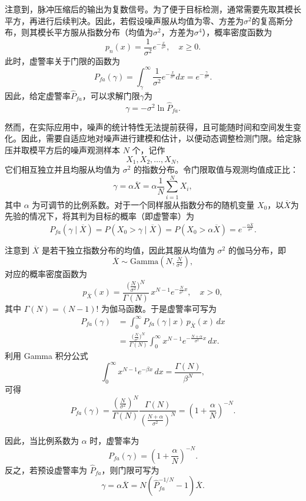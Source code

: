 注意到，脉冲压缩后的输出为复数信号。为了便于目标检测，通常需要先取其模长平方，再进行后续判决。因此，若假设噪声服从均值为零、方差为\( \sigma^2 \)的复高斯分布，则其模长平方服从指数分布（均值为\( \sigma^2 \)，方差为\( \sigma^4 \)），概率密度函数为
\[
    p_n(x) = \frac{1}{\sigma^2} e^{-\frac{x}{\sigma^2}}, \quad x \geq 0.
\]
此时，虚警率关于门限的函数为
\[
    P_{fa}(\gamma) = \int_{\gamma}^{\infty} \frac{1}{\sigma^2} e^{-\frac{x}{\sigma^2}} dx = e^{-\frac{\gamma}{\sigma^2}}.
\]
因此，给定虚警率\( \hat{P}_{fa} \)，可以求解门限\( \gamma \)为
\[
    \gamma = -\sigma^2 \ln \hat{P}_{fa}.
\]

然而，在实际应用中，噪声的统计特性无法提前获得，且可能随时间和空间发生变化。因此，需要自适应地对噪声进行建模和估计，以便动态调整检测门限。给定脉压并取模平方后的噪声观测样本 \( N \) 个，记作
\[
    X_1, X_2, \ldots, X_N,
\]
它们相互独立并且均服从均值为 \( \sigma^2 \) 的指数分布。令门限取值与观测均值成正比：
\[
    \gamma = \alpha \overline{X} = \alpha \frac{1}{N}\sum_{i=1}^{N} X_i,
\]
其中 \( \alpha \) 为可调节的比例系数。对于一个同样服从指数分布的随机变量 \( X_0 \)，以\( \overline{X} \)为先验的情况下，将其判为目标的概率（即虚警率）为
\[
    P_{fa}(\gamma \mid \overline{X}) = P(X_0 > \gamma \mid \overline{X})
    = P(X_0 > \alpha \overline{X})
    = e^{-\tfrac{\alpha \overline{X}}{\sigma^2}}.
\]

注意到 \( \overline{X} \) 是若干独立指数分布的均值，因此其服从均值为 \( \sigma^2 \) 的伽马分布，即
\[
    \overline{X} \sim \mathrm{Gamma}\!\left(N, \tfrac{N}{\sigma^2}\right),
\]
对应的概率密度函数为
\[
    p_{\overline{X}}(x) = \frac{\bigl(\tfrac{N}{\sigma^2}\bigr)^N}{\Gamma(N)}\,x^{N-1}
    e^{-\tfrac{N}{\sigma^2}x}, \quad x>0,
\]
其中 \( \Gamma(N)=(N-1)! \) 为伽马函数。于是虚警率可写为
\[
    \begin{aligned}
        P_{fa}(\gamma)
         & = \int_{0}^{\infty} P_{fa}(\gamma \mid x)\,p_{\overline{X}}(x)\,dx \\
         & = \frac{\bigl(\tfrac{N}{\sigma^2}\bigr)^N}{\Gamma(N)}
        \int_{0}^{\infty} x^{N-1} e^{-\tfrac{N+\alpha}{\sigma^2}x}\,dx.
    \end{aligned}
\]
利用 Gamma 积分公式
\[
    \int_{0}^{\infty} x^{N-1} e^{-\beta x}\,dx = \frac{\Gamma(N)}{\beta^N},
\]
可得
\[
    P_{fa}(\gamma) = \frac{\left(\frac{N}{\sigma^2}\right)^{N}}{\Gamma(N)} \frac{\Gamma(N)}{\left(\frac{N+\alpha}{\sigma^2}\right)^{N}} = \left(1+\frac{\alpha}{N}\right)^{-N}.
\]

因此，当比例系数为 \( \alpha \) 时，虚警率为
\[
    P_{fa}(\gamma) = \left(1+\frac{\alpha}{N}\right)^{-N}.
\]
反之，若预设虚警率为 \( \hat{P}_{fa} \)，则门限可写为
\[
    \gamma = \alpha \overline{X}
    = N\!\left(\hat{P}_{fa}^{-1/N}-1\right)\overline{X}.
\]

